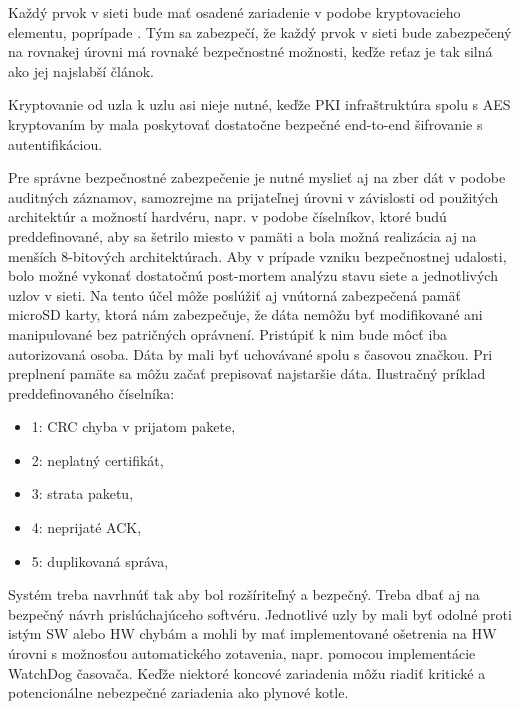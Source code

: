 \documentclass[12pt,a4paper,oneside,openright]{report}
\begin{document}
Každý prvok v sieti bude mať osadené zariadenie v podobe kryptovacieho elementu, poprípade . Tým sa zabezpečí, že každý prvok v sieti bude zabezpečený na rovnakej úrovni má rovnaké bezpečnostné možnosti, keďže reťaz je tak silná ako jej najslabší článok.

Kryptovanie od uzla k uzlu asi nieje nutné, keďže PKI infraštruktúra spolu s AES kryptovaním by mala poskytovať dostatočne bezpečné end-to-end šifrovanie s autentifikáciou.

Pre správne bezpečnostné zabezpečenie je nutné myslieť aj na zber dát v podobe auditných záznamov, samozrejme na prijateľnej úrovni v závislosti od použitých architektúr a možností hardvéru, napr. v podobe číselníkov, ktoré budú preddefinované, aby sa šetrilo miesto v pamäti a bola možná realizácia aj na menších 8-bitových architektúrach. Aby v prípade vzniku bezpečnostnej udalosti, bolo možné vykonať dostatočnú post-mortem analýzu stavu siete a jednotlivých uzlov v sieti. Na tento účel môže poslúžiť aj vnútorná zabezpečená pamäť microSD karty, ktorá nám zabezpečuje, že dáta nemôžu byť  modifikované ani manipulované bez patričných oprávnení. Pristúpiť k nim bude môcť iba autorizovaná osoba. Dáta by mali byť uchovávané spolu s časovou značkou. Pri preplnení pamäte sa môžu začať prepisovať najstaršie dáta.
Ilustračný príklad preddefinovaného číselníka:
\begin{itemize}
	\item 1: CRC chyba v prijatom pakete,
	\item 2: neplatný certifikát,
	\item 3: strata paketu, 
	\item 4: neprijaté ACK,
	\item 5: duplikovaná správa,
\end{itemize}
\onehalfspacing

Systém treba navrhnúť tak aby bol rozšíriteľný a bezpečný. Treba dbať aj na bezpečný návrh prislúchajúceho softvéru.
Jednotlivé uzly by mali byť odolné proti istým SW alebo HW chybám a mohli by mať implementované ošetrenia na HW úrovni s možnosťou automatického zotavenia, napr. pomocou implementácie WatchDog časovača. Keďže niektoré koncové zariadenia môžu riadiť kritické a potencionálne nebezpečné zariadenia ako plynové kotle.
\end{document}
